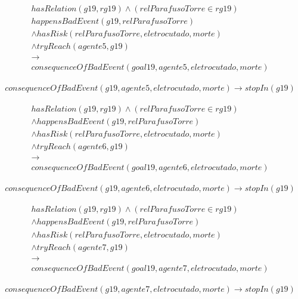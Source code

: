 \documentclass[12pt]{article}
\begin{document}
\begin{eqnarray}\nonumber
	hasRelation(g19,rg19) \nonumber
	\wedge (relParafusoTorre \in rg19) \nonumber \\ 
	happensBadEvent(g19,relParafusoTorre)  \nonumber \\
	\wedge hasRisk(relParafusoTorre,eletrocutado,morte) \nonumber \\ 
	\wedge tryReach(agente5,g19) \nonumber \\ 
	\to \nonumber \\ 
	consequenceOfBadEvent(goal19,agente5,eletrocutado,morte)
\end{eqnarray}

\begin{eqnarray}
	consequenceOfBadEvent(g19,agente5,eletrocutado,morte) \to stopIn(g19)
\end{eqnarray}

\begin{eqnarray}\nonumber
	hasRelation(g19,rg19) \nonumber
	\wedge (relParafusoTorre \in rg19) \nonumber \\ 
	\wedge happensBadEvent(g19,relParafusoTorre)  \nonumber \\
	\wedge hasRisk(relParafusoTorre,eletrocutado,morte) \nonumber \\ 
	\wedge tryReach(agente6,g19) \nonumber \\ 
	\to \nonumber \\ 
	consequenceOfBadEvent(goal19,agente6,eletrocutado,morte)
\end{eqnarray}

\begin{eqnarray}
	consequenceOfBadEvent(g19,agente6,eletrocutado,morte) \to stopIn(g19)
\end{eqnarray}

\begin{eqnarray}\nonumber
	hasRelation(g19,rg19) \nonumber
	\wedge (relParafusoTorre \in rg19) \nonumber \\ 
	\wedge happensBadEvent(g19,relParafusoTorre)  \nonumber \\
	\wedge hasRisk(relParafusoTorre,eletrocutado,morte) \nonumber \\ 
	\wedge tryReach(agente7,g19) \nonumber \\ 
	\to \nonumber \\ 
	consequenceOfBadEvent(goal19,agente7,eletrocutado,morte)
\end{eqnarray}

\begin{eqnarray}
	consequenceOfBadEvent(g19,agente7,eletrocutado,morte) \to stopIn(g19)
\end{eqnarray}
\end{document}

